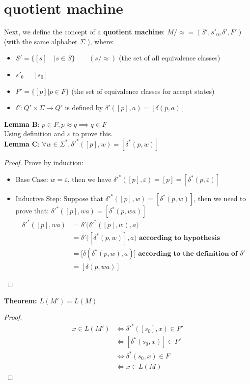 \documentclass [9 pt]{article}
\theoremstyle{definition}
\begin{document}
\section*{quotient machine}
Next, we define the concept of a \textbf{quotient machine}: $M/\approx =(S',s'_0, \delta',F')$
 (with the same alphabet $\Sigma$ ), where:
 \begin{itemize}
 	\item $S' = \{[s]\quad | s \in S\}\quad \quad (s/ \approx)$ (the set of all equivalence classes)
	\item $s'_0=[s_0]$
	\item $F' =\{[p]| p\in F \}$ (the set of equivalence classes for accept states)
	\item $\delta' : Q'\times \Sigma \to Q'$ is defined by  $ \delta'([p], a) = [\delta(p, a)]  $
 \end{itemize}
 \textbf{Lemma B}: $p \in F, p \approx q \implies q \in F$\\
 Using definition and $\varepsilon$ to prove this.\\
 \newline
 \textbf{Lemma C}: $\forall w \in \Sigma^*, \delta'^*([p], w) = [ \delta^*(p, w) ] $
\begin{proof}
	Prove by induction:
	\begin{itemize}
		\item Base Case: $w = \varepsilon$, then we have $ \delta'^*([p], \varepsilon ) = [p] =  [ \delta^*(p, \varepsilon ) ] $
		\item Inductive Step: Suppose that $\delta'^*([p], w) = [ \delta^*(p, w) ]$, then we need to prove that: $\delta'^*([p], wa) = [ \delta^*(p, wa) ]$
		\begin{align*}
			\delta'^*([p], wa) 
			&= \delta'\bigg(\delta'^*([p], w), a \bigg)\\
			&= \delta'\bigg([ \delta^*(p, w) ], a \bigg) \textbf{ according to hypothesis} \\
			&= \bigg[\delta( \delta^*(p, w)  ,a  )  \bigg] \textbf{ according to the definition of } \delta' \\
			&= [\delta(p, wa) ]
		\end{align*}
	\end{itemize}
\end{proof}
\textbf{Theorem:} $L(M') = L(M) $
\begin{proof}
	\begin{align*}
		x \in L(M') 
		&\Leftrightarrow \delta'^*([s_0], x) \in F'\\
		&\Leftrightarrow [\delta^*(s_0, x)] \in F'\\
		&\Leftrightarrow \delta^*(s_0, x) \in F\\
		&\Leftrightarrow x \in L(M)
	\end{align*}
\end{proof}
\end{document}
